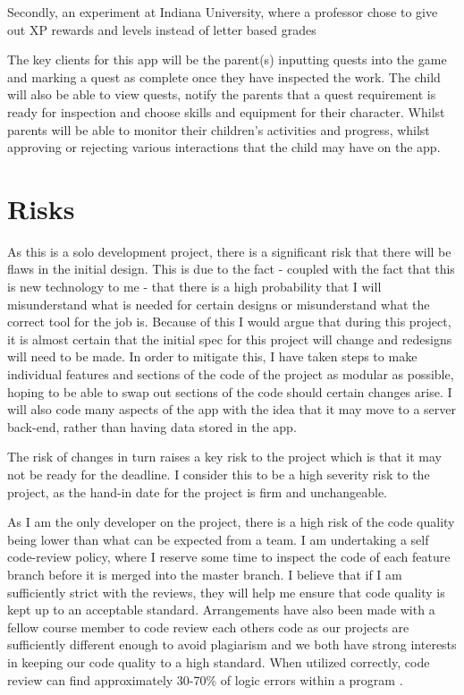 Secondly, an experiment at Indiana University, where a professor chose to give out XP rewards and levels instead of letter based grades \cite{sheldon2011multiplayer} 

The key clients for this app will be the parent(s) inputting quests into the game and marking a quest as complete once they have inspected the work. 
The child will also be able to view quests, notify the parents that a quest requirement is ready for inspection and choose skills and equipment for their character. 
Whilst parents will be able to monitor their children's activities and progress, whilst approving or rejecting various interactions that the child may have on the app.

\section{Risks}
As this is a solo development project, there is a significant risk that there will be flaws in the initial design. 
This is due to the fact - coupled with the fact that this is new technology to me - that there is a high probability that I will misunderstand what is needed for certain designs or misunderstand what the correct tool for the job is.
Because of this I would argue that during this project, it is almost certain that the initial spec for this project will change and redesigns will need to be made. 
In order to mitigate this, I have taken steps to make individual features and sections of the code of the project as modular as possible, hoping to be able to swap out sections of the code should certain changes arise.
I will also code many aspects of the app with the idea that it may move to a server back-end, rather than having data stored in the app. 
 
The risk of changes in turn raises a key risk to the project which is that it may not be ready for the deadline. 
I consider this to be a high severity risk to the project, as the hand-in date for the project is firm and unchangeable. 

As I am the only developer on the project, there is a high risk of the code quality being lower than what can be expected from a team.
I am undertaking a self code-review policy, where I reserve some time to inspect the code of each feature branch before it is merged into the master branch.
I believe that if I am sufficiently strict with the reviews, they will help me ensure that code quality is kept up to an acceptable standard.
Arrangements have also been made with a fellow course member to code review each others code as our projects are sufficiently different enough to avoid plagiarism and we both have strong interests in keeping our code quality to a high standard.
When utilized correctly, code review can find approximately 30-70\% of logic errors within a program \citep{myers2011art}.

